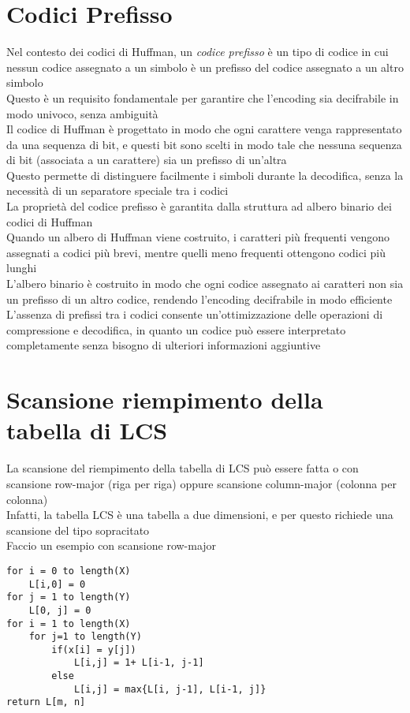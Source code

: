 \documentclass[12pt,oneside,a4paper]{article}
\begin{document}
\section{Codici Prefisso}
Nel contesto dei codici di Huffman, un \textit{codice prefisso} è un tipo di codice in cui nessun codice assegnato a un simbolo è un prefisso del codice assegnato a un altro simbolo\\
Questo è un requisito fondamentale per garantire che l'encoding sia decifrabile in modo univoco, senza ambiguità\\
Il codice di Huffman è progettato in modo che ogni carattere venga rappresentato da una sequenza di bit, e questi bit sono scelti in modo tale che nessuna sequenza di bit (associata a un carattere) sia un prefisso di un'altra\\
Questo permette di distinguere facilmente i simboli durante la decodifica, senza la necessità di un separatore speciale tra i codici\\
La proprietà del codice prefisso è garantita dalla struttura ad albero binario dei codici di Huffman\\
Quando un albero di Huffman viene costruito, i caratteri più frequenti vengono assegnati a codici più brevi, mentre quelli meno frequenti ottengono codici più lunghi\\
L'albero binario è costruito in modo che ogni codice assegnato ai caratteri non sia un prefisso di un altro codice, rendendo l'encoding decifrabile in modo efficiente\\
L'assenza di prefissi tra i codici consente un'ottimizzazione delle operazioni di compressione e decodifica, in quanto un codice può essere interpretato completamente senza bisogno di ulteriori informazioni aggiuntive
\section{Scansione riempimento della tabella di LCS}
La scansione del riempimento della tabella di LCS può essere fatta o con scansione row-major (riga per riga) oppure scansione column-major (colonna per colonna)\\
Infatti, la tabella LCS è una tabella a due dimensioni, e per questo richiede una scansione del tipo sopracitato\\
Faccio un esempio con scansione row-major
\newpage
\begin{lstlisting}[style=pseudocodice]
for i = 0 to length(X)
	L[i,0] = 0
for j = 1 to length(Y)
	L[0, j] = 0
for i = 1 to length(X)
	for j=1 to length(Y)
		if(x[i] = y[j])
			L[i,j] = 1+ L[i-1, j-1]
		else
			L[i,j] = max{L[i, j-1], L[i-1, j]}
return L[m, n]
\end{lstlisting}
\end{document}
